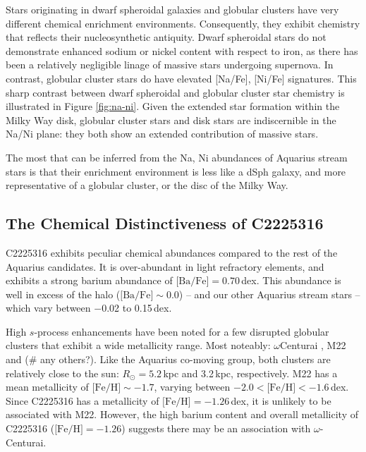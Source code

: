 \documentclass{emulateapj}
\begin{document}
Stars originating in dwarf spheroidal galaxies and globular clusters have very different chemical enrichment environments. Consequently, they exhibit chemistry that reflects their nucleosynthetic antiquity. Dwarf spheroidal stars do not demonstrate enhanced sodium or nickel content with respect to iron, as there has been a relatively negligible linage of massive stars undergoing supernova. In contrast, globular cluster stars do have elevated [Na/Fe], [Ni/Fe] signatures. This sharp contrast between dwarf spheroidal and globular cluster star chemistry is illustrated in Figure \ref{fig:na-ni}. Given the extended star formation within the Milky Way disk, globular cluster stars and disk stars are indiscernible in the Na/Ni plane: they both show an extended contribution of massive stars. 

The most that can be inferred from the Na, Ni abundances of Aquarius stream stars is that their enrichment environment is less like a dSph galaxy, and more representative of a globular cluster, or the disc of the Milky Way. 



\subsection{The Chemical Distinctiveness of C2225316}


C2225316 exhibits peculiar chemical abundances compared to the rest of the Aquarius candidates. It is over-abundant in light refractory elements, and exhibits a strong barium abundance of $\mbox{[Ba/Fe]} = 0.70$\,dex. This abundance is well in excess of the halo ($\mbox{[Ba/Fe]} \sim 0.0$) \--- and our other Aquarius stream stars \--- which vary between $-$0.02 to 0.15\,dex.

High $s$-process enhancements have been noted for a few disrupted globular clusters that exhibit a wide metallicity range. Most noteably: $\omega$Centurai \citep{majewski;et-al_2012}, M22 \citep{marino;et-al_2011} and (\# any others?). Like the Aquarius co-moving group, both clusters are relatively close to the sun: $R_\odot = 5.2$\,kpc and 3.2\,kpc, respectively. M22 has a mean metallicity of $\mbox{[Fe/H]} \sim -1.7$, varying between $-2.0 < \mbox{[Fe/H]} < -1.6$\,dex. Since C2225316 has a metallicity of $\mbox{[Fe/H]} = -1.26$\,dex, it is unlikely to be associated with M22. However, the high barium content and overall metallicity of C2225316 ($\mbox{[Fe/H]} = -1.26$) suggests there may be an association with $\omega$-Centurai.
\end{document}

